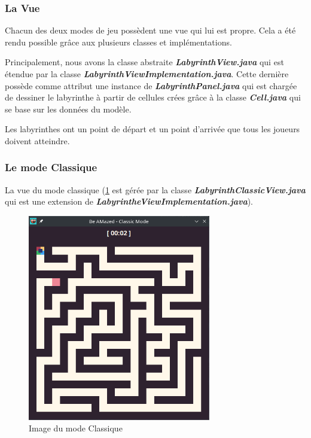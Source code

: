 \subsubsection{La Vue}
\label{subsubsec:vue}

Chacun des deux modes de jeu possèdent une vue qui lui est propre.
Cela a été rendu possible grâce aux plusieurs classes et implémentations.

Principalement, nous avons la classe abstraite \textbf{\textit{LabyrinthView.java}} qui est étendue par la classe \textbf{\textit{LabyrinthViewImplementation.java}}.
Cette dernière possède comme attribut une instance de
\textbf{\textit{LabyrinthPanel.java}} qui est chargée de dessiner le labyrinthe à partir de cellules crées grâce à la classe \textbf{\textit{Cell.java}} qui se base sur les données du modèle.

Les labyrinthes ont un point de départ et un point d'arrivée que tous les joueurs doivent atteindre.
\subsubsection*{Le mode Classique}

La vue du mode classique (\ref{fig:ClassicModeLabyrinth} est gérée par la classe \textbf{\textit{LabyrinthClassicView.java}} qui est une extension de \textbf{\textit{LabyrintheViewImplementation.java}}).

\begin{figure}[!htb]%
    \centering
    \includegraphics[width=8cm]{ressources/Implementation/Labyrinthe/Vue/Classic/Classic.png}%
    \caption{Image du mode Classique}%
    \label{fig:ClassicModeLabyrinth}
\end{figure}
